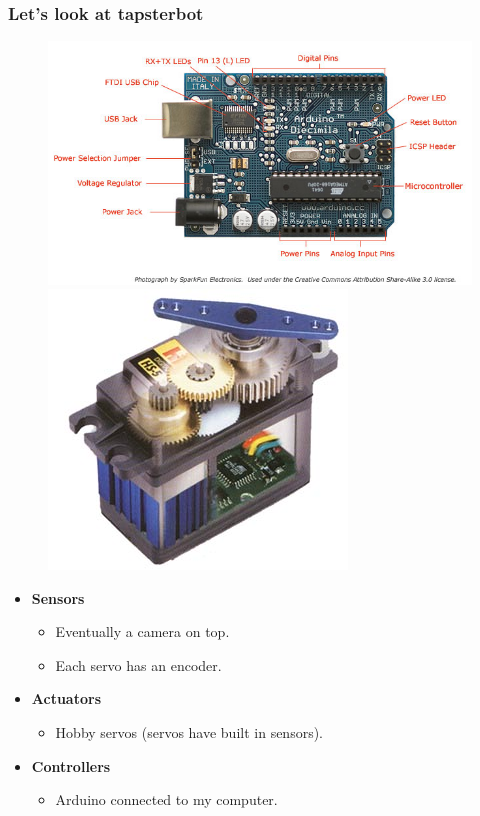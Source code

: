 \documentclass[compress]{beamer}
\begin{document}
\begin{frame}
   \frametitle{Let's look at tapsterbot}
   \begin{figure}
     \includegraphics[width=0.45\linewidth]{arduino.jpg}
     \quad 
     \includegraphics[width=0.25\linewidth]{hitec.jpg}
   \end{figure}

   \begin{itemize}
   \item \textbf{Sensors}
     \begin{itemize}
       \item Eventually a camera on top.
       \item Each servo has an encoder.
     \end{itemize}
   \item \textbf{Actuators}
     \begin{itemize}
       \item Hobby servos (servos have built in sensors).
     \end{itemize}     
   \item \textbf{Controllers} 
     \begin{itemize}
       \item Arduino connected to my computer.
     \end{itemize}          
   \end{itemize}     
 \end{frame}
\end{document}
